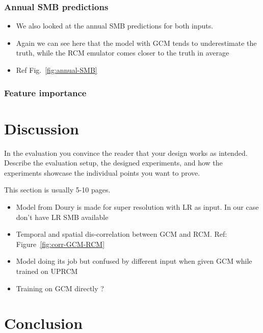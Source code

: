 \documentclass[a4paper,11pt,oneside]{report}
\begin{document}
\subsection{Annual SMB predictions}

\begin{itemize}
    \item We also looked at the annual SMB predictions for both inputs. 
    \item Again we can see here that the model with GCM tends to underestimate the truth, while the RCM emulator comes closer to the truth in average
    \item Ref Fig.~\ref{fig:annual-SMB}
\end{itemize}





\subsection{Feature importance}


\chapter{Discussion}

In the evaluation you convince the reader that your design works as intended.
Describe the evaluation setup, the designed experiments, and how the
experiments showcase the individual points you want to prove.

This section is usually 5-10 pages.

\begin{itemize}
    \item Model from Doury is made for super resolution with LR as input. In our case don't have LR SMB available
    \item Temporal and spatial dis-correlation between GCM and RCM. Ref: Figure~\ref{fig:corr-GCM-RCM}
    \item Model doing its job but confused by different input when given GCM while trained on UPRCM
    \item Training on GCM directly ?
\end{itemize}



\chapter{Conclusion}
\end{document}
